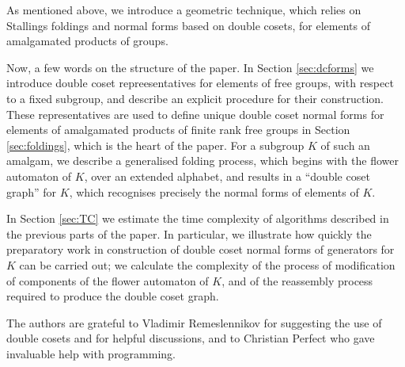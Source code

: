 \documentclass[a4paper,12pt]{article}
\numberwithin{equation}{section}
\numberwithin{figure}{section}
\begin{document}
As mentioned above, we  introduce a  geometric
technique, which relies on Stallings foldings and
normal forms based on double cosets, for elements of amalgamated products of
groups.

Now, a few words on the structure of the paper. In Section
\ref{sec:dcforms} we introduce double coset repreesentatives for
elements of free groups, with respect to a fixed subgroup,
and
  describe an explicit procedure
 for their construction.
These representatives are used to define unique double coset normal forms
for elements of
amalgamated products of finite rank free groups in Section  \ref{sec:foldings}, which
 is the heart of the paper. For a subgroup $K$ of such an amalgam, we
describe a generalised folding process, which begins with the flower automaton
of $K$, over an extended alphabet, and results in
a ``double coset graph'' for $K$, which  recognises
precisely the  normal forms of elements of $K$.

In Section \ref{sec:TC} we estimate the time complexity of
algorithms described in the previous parts of the paper. In
particular, we illustrate how quickly the  preparatory
work in construction of  double coset normal forms of generators
for $K$  can be carried out; we calculate  the complexity of the process of modification of
components of the flower automaton of $K$, and of the reassembly process required to
produce the double coset graph.

The authors are grateful to Vladimir Remeslennikov for suggesting the use of double cosets and
for helpful
discussions,  and to Christian Perfect who gave invaluable help with programming.
\end{document}

